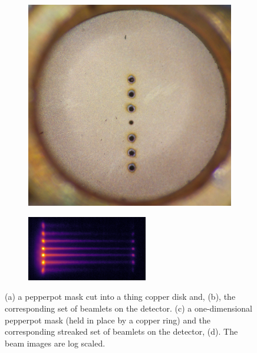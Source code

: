 \begin{figure}
    \begin{subfigure}{0.49\linewidth}
    \centering
    \includegraphics[width=\linewidth]{part2/Figs/example_pepperpot_1d.jpg}
    \caption{}
    \label{figure:1d_pepperpot}
    \end{subfigure}
    \begin{subfigure}{0.49\linewidth}
    \centering
    \includegraphics[width=\linewidth]{part2/Figs/example_streaked_pepperpot.png}
    \caption{}
    \label{figure:streaked_1d_pepperpot}
    \end{subfigure}
    \caption{(a) a pepperpot mask cut into a thing copper disk and, (b), the corresponding set of beamlets on the detector. (c) a one-dimensional pepperpot mask (held in place by a copper ring) and the corresponding streaked set of beamlets on the detector, (d). The beam images are log scaled.}
    \label{figure:pepperpot_example}
\end{figure}

